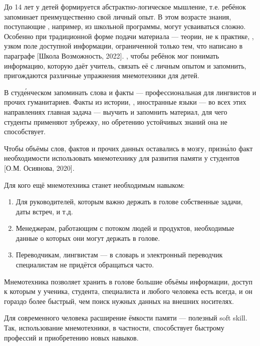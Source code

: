 До 14 лет у детей формируется абстрактно-логическое мышление, т.е. ребёнок запоминает преимущественно свой личный опыт. В этом возрасте знания, поступающие , например, из школьной программы, могут усваиваться сложно. Особенно при традиционной форме подачи материала ---  теории, не  к практике, , узком поле доступной информации, ограниченной только тем, что написано в параграфе [Школа Возможность, 2022]. , чтобы ребёнок мог понимать информацию, которую даёт учитель, связать её с личным опытом и запомнить, пригождаются различные упражнения мнемотехники для детей.

В студ\'{е}нческом  запоминать слова и факты --- профессиональная  для лингвистов и прочих гуманитариев. Факты из истории, , иностранные языки --- во всех этих направлениях главная задача --- выучить и запомнить материал, для чего студенты применяют зубрежку, но обретению устойчивых знаний она не способствует.

Чтобы объёмы слов, фактов и прочих данных оставались в мозгу,  призн\'{а}ло факт необходимости использовать мнемотехнику для развития памяти у студентов [О.М. Осиянова, 2020].

Для кого ещё мнемотехника станет необходимым навыком:
\begin{enumerate}
    \item Для руководителей, которым важно держать в голове собственные задачи, даты встреч,   и т.д.
    \item Менеджерам, работающим с потоком людей и продуктов, необходимые данные о которых они могут держать в голове.
    \item Переводчикам, лингвистам --– в словарь и электронный переводчик специалистам не придётся обращаться часто.
\end{enumerate}

Мнемотехника позволяет хранить в голове большие объёмы информации, доступ к которым у ученика, студента, специалиста и любого человека есть всегда, и он гораздо более быстрый, чем поиск нужных данных на внешних носителях.

Для современного человека расширение ёмкости памяти --- полезный soft skill. Так, использование мнемотехники, в частности, способствует быстрому  профессий и приобретению новых навыков.

